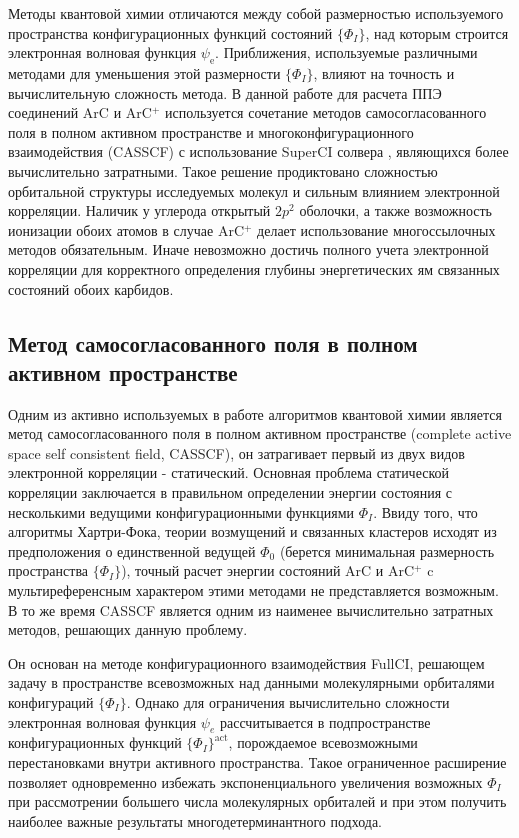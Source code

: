 \documentclass[12pt]{extarticle}
\begin{document}
  	Методы квантовой химии отличаются между собой размерностью используемого пространства конфигурационных функций состояний $\{\Phi_I \}$, над которым строится электронная волновая функция $\psi_\text{e}$. Приближения, используемые различными методами для уменьшения этой размерности $\{\Phi_I \}$, влияют на точность и вычислительную сложность метода. В данной работе для расчета ППЭ соединений ArC и ArC$^+$ используется сочетание методов самосогласованного поля в полном активном пространстве и многоконфигурационного взаимодействия (CASSCF) \cite{89} с использование SuperCI солвера \cite{casscf}, являющихся более вычислительно затратными. Такое решение продиктовано сложностью орбитальной структуры исследуемых молекул и сильным влиянием электронной корреляции. Наличик у углерода открытый $2p^2$ оболочки, а также возможность ионизации обоих атомов в случае ArC$^+$ делает использование многоссылочных методов обязательным. Иначе невозможно достичь полного учета электронной корреляции для корректного определения глубины энергетических ям связанных состояний обоих карбидов.
    
    \subsection{Метод самосогласованного поля в полном активном пространстве}
    \label{sec:Chapter1.2}
    
    Одним из активно используемых в работе алгоритмов квантовой химии является метод самосогласованного поля в полном активном пространстве (complete active space self consistent field, CASSCF), он затрагивает первый из двух видов электронной корреляции - статический. Основная проблема статической корреляции заключается в правильном определении энергии состояния с несколькими ведущими конфигурационными функциями $\Phi_I$. Ввиду того, что алгоритмы Хартри-Фока, теории возмущений и связанных кластеров исходят из предположения о единственной ведущей $\Phi_0$ (берется минимальная размерность пространства $\{ \Phi_I \}$), точный расчет энергии состояний ArC и ArC$^+$ c мультиреференсным характером этими методами не представляется возможным. В то же время CASSCF является одним из наименее вычислительно затратных методов, решающих данную проблему.
    
    Он основан на методе конфигурационного взаимодействия FullCI, решающем задачу в пространстве всевозможных над данными молекулярными орбиталями конфигураций $\{ \Phi_I \}$. Однако для ограничения вычислительно сложности электронная волновая функция $\psi_e$ рассчитывается в подпространстве конфигурационных функций $\{ \Phi_I \}^\text{act}$, порождаемое всевозможными перестановками внутри активного пространства. Такое ограниченное расширение позволяет одновременно избежать экспоненциального увеличения возможных $\Phi_I$ при рассмотрении большего числа молекулярных орбиталей и при этом получить наиболее важные результаты многодетерминантного подхода.
    
\end{document}
